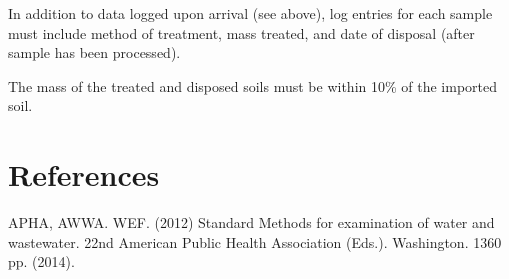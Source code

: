 \documentclass[12pt]{../SOP3}\usepackage[]{graphicx}\usepackage[]{color}
\begin{document}
\NP In addition to data logged upon arrival (see above), log entries for each sample must include method of treatment, mass treated, and date of disposal (after sample has been processed).

\NP The mass of the treated and disposed soils must be within 10\% of the imported soil.


\section{References}

\NP APHA, AWWA. WEF. (2012) Standard Methods for examination of water and wastewater. 22nd American Public Health Association (Eds.). Washington. 1360 pp. (2014).
\end{document}
